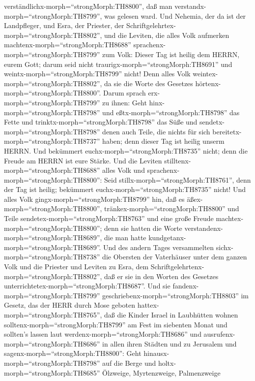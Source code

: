 verständlichx-morph=``strongMorph:TH8800'', daß man
verstandx-morph=``strongMorph:TH8799'', was gelesen ward. 
Und Nehemia, der da ist der Landpfleger, und Esra, der Priester, der
Schriftgelehrtex-morph=``strongMorph:TH8802'', und die Leviten, die
alles Volk aufmerken machtenx-morph=``strongMorph:TH8688''
sprachenx-morph=``strongMorph:TH8799'' zum Volk: Dieser Tag ist heilig
dem HERRN, eurem Gott; darum seid nicht
traurigx-morph=``strongMorph:TH8691'' und
weintx-morph=``strongMorph:TH8799'' nicht! Denn alles Volk
weintex-morph=``strongMorph:TH8802'', da sie die Worte des Gesetzes
hörtenx-morph=``strongMorph:TH8800''.  Darum sprach
erx-morph=``strongMorph:TH8799'' zu ihnen: Geht
hinx-morph=``strongMorph:TH8798'' und eßtx-morph=``strongMorph:TH8798''
das Fette und trinktx-morph=``strongMorph:TH8798'' das Süße und
sendetx-morph=``strongMorph:TH8798'' denen auch Teile, die nichts für
sich bereitetx-morph=``strongMorph:TH8737'' haben; denn dieser Tag ist
heilig unserm HERRN. Und bekümmert euchx-morph=``strongMorph:TH8735''
nicht; denn die Freude am HERRN ist eure Stärke.  Und die
Leviten stilltenx-morph=``strongMorph:TH8688'' alles Volk und
sprachenx-morph=``strongMorph:TH8800'': Seid
stillx-morph=``strongMorph:TH8761'', denn der Tag ist heilig; bekümmert
euchx-morph=``strongMorph:TH8735'' nicht!  Und alles Volk
gingx-morph=``strongMorph:TH8799'' hin, daß es
äßex-morph=``strongMorph:TH8800'', tränkex-morph=``strongMorph:TH8800''
und Teile sendetex-morph=``strongMorph:TH8763'' und eine große Freude
machtex-morph=``strongMorph:TH8800''; denn sie hatten die Worte
verstandenx-morph=``strongMorph:TH8689'', die man hatte
kundgetanx-morph=``strongMorph:TH8689''.  Und des andern
Tages versammelten sichx-morph=``strongMorph:TH8738'' die Obersten der
Vaterhäuser unter dem ganzen Volk und die Priester und Leviten zu Esra,
dem Schriftgelehrtenx-morph=``strongMorph:TH8802'', daß er sie in den
Worten des Gesetzes unterrichtetex-morph=``strongMorph:TH8687''.
 Und sie fandenx-morph=``strongMorph:TH8799''
geschriebenx-morph=``strongMorph:TH8803'' im Gesetz, das der HERR durch
Mose geboten hattex-morph=``strongMorph:TH8765'', daß die Kinder Israel
in Laubhütten wohnen solltenx-morph=``strongMorph:TH8799'' am Fest im
siebenten Monat  und sollten's lassen laut
werdenx-morph=``strongMorph:TH8686'' und
ausrufenx-morph=``strongMorph:TH8686'' in allen ihren Städten und zu
Jerusalem und sagenx-morph=``strongMorph:TH8800'': Geht
hinausx-morph=``strongMorph:TH8798'' auf die Berge und
holtx-morph=``strongMorph:TH8685'' Ölzweige, Myrtenzweige, Palmenzweige
